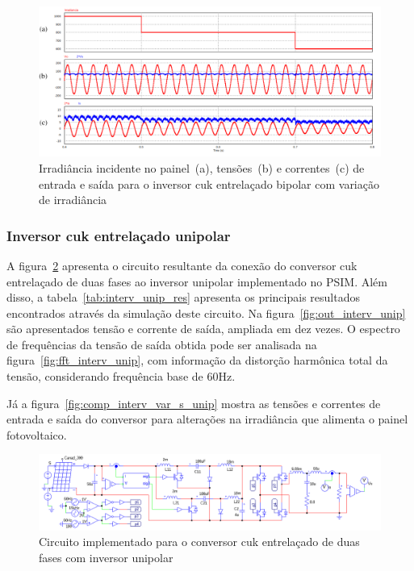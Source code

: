 \documentclass[
	12pt,				%
	openright,			%
	twoside,			%
	a4paper,			%
	english,			%
	french,				%
	spanish,			%
	brazil,				%
	]{abntex2}
\begin{document}
\begin{figure}[H]%
	\captionsetup{justification=centering}
	\centering
		\includegraphics[width= \linewidth]{comp_interv_var_s}
		\caption{Irradiância incidente no painel~(a), tensões~(b) e correntes~(c) de entrada e saída para o inversor cuk entrelaçado bipolar com variação de irradiância}
		\label{fig:comp_interv_var_s}
\end{figure}

\subsubsection{Inversor cuk entrelaçado unipolar}

A figura~\ref{fig:comp_interv_circ_clean_unip} apresenta o circuito resultante da conexão do conversor cuk entrelaçado de duas fases ao inversor unipolar implementado no PSIM. Além disso, a tabela~\ref{tab:interv_unip_res} apresenta os principais resultados encontrados através da simulação deste circuito. Na figura~\ref{fig:out_interv_unip} são apresentados tensão e corrente de saída, ampliada em dez vezes. O espectro de frequências da tensão de saída obtida pode ser analisada na figura~\ref{fig:fft_interv_unip},  com informação da distorção harmônica total da tensão, considerando frequência base de 60Hz.

Já a figura~\ref{fig:comp_interv_var_s_unip} mostra as tensões e correntes de entrada e saída do conversor para alterações na irradiância que alimenta o painel fotovoltaico.

\begin{figure}[H]%
	\captionsetup{justification=centering}
	\centering
		\includegraphics[width= \linewidth]{comp_interv_circ_clean_unip}
		\caption{Circuito implementado para o conversor cuk entrelaçado de duas fases com inversor unipolar}
		\label{fig:comp_interv_circ_clean_unip}
\end{figure}
\end{document}
